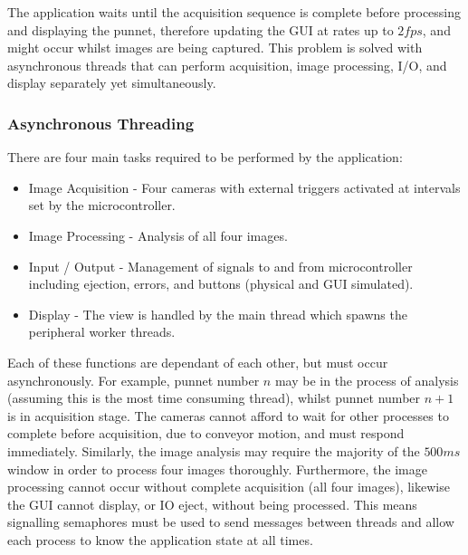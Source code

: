 \documentclass[fleqn,twoside,12pt]{report}
\begin{document}
The application waits until the acquisition sequence is complete before processing and displaying the punnet, therefore updating the GUI at rates up to $2fps$, and might occur whilst images are being captured. This problem is solved with asynchronous threads that can perform acquisition, image processing, I/O, and display separately yet simultaneously.


\subsubsection{Asynchronous Threading}

There are four main tasks required to be performed by the application:


\begin{itemize}
	\item Image Acquisition - Four cameras with external triggers activated at intervals set by the microcontroller.
	\item Image Processing - Analysis of all four images.
	\item Input / Output - Management of signals to and from microcontroller including ejection, errors, and buttons (physical and GUI simulated).
	\item Display - The view is handled by the main thread which spawns the peripheral worker threads.
\end{itemize}


Each of these functions are dependant of each other, but must occur asynchronously. For example, punnet number $n$ may be in the process of analysis (assuming this is the most time consuming thread), whilst punnet number $n+1$ is in acquisition stage. The cameras cannot afford to wait for other processes to complete before acquisition, due to conveyor motion, and must respond immediately. Similarly, the image analysis may require the majority of the $500ms$ window in order to process four images thoroughly. Furthermore, the image processing cannot occur without complete acquisition (all four images), likewise the GUI cannot display, or IO eject, without being processed. This means signalling semaphores must be used to send messages between threads and allow each process to know the application state at all times.
\end{document}
